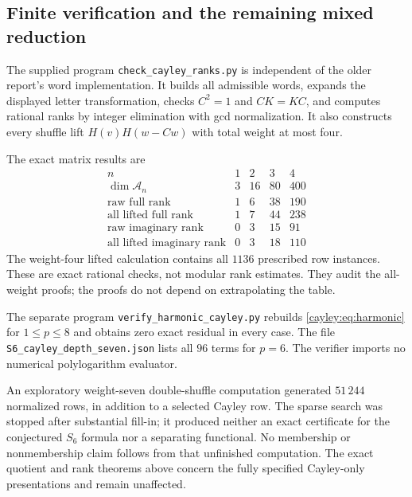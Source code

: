 \subsection{Finite verification and the remaining mixed reduction}

The supplied program \texttt{check\_cayley\_ranks.py} is independent
of the older report's word implementation.  It builds all admissible
words, expands the displayed letter transformation, checks $C^2=1$
and $CK=KC$, and computes rational ranks by integer elimination
with gcd normalization.  It also constructs every shuffle lift
$H(v)H(w-Cw)$ with total weight at most four.

The exact matrix results are
\[
\begin{array}{c|rrrr}
n&1&2&3&4\\ \hline
\dim\mathcal A_n&3&16&80&400\\
\text{raw full rank}&1&6&38&190\\
\text{all lifted full rank}&1&7&44&238\\
\text{raw imaginary rank}&0&3&15&91\\
\text{all lifted imaginary rank}&0&3&18&110
\end{array}
\]
The weight-four lifted calculation contains all $1136$ prescribed
row instances.  These are exact rational checks, not modular rank
estimates.  They audit the all-weight proofs; the proofs do not
depend on extrapolating the table.

The separate program \texttt{verify\_harmonic\_cayley.py} rebuilds
\eqref{cayley:eq:harmonic} for $1\le p\le8$ and obtains zero exact
residual in every case.  The file
\texttt{S6\_cayley\_depth\_seven.json} lists all $96$ terms for
$p=6$.  The verifier imports no numerical polylogarithm evaluator.

An exploratory weight-seven double-shuffle computation generated
$51\,244$ normalized rows, in addition to a selected Cayley row.
The sparse search was stopped after substantial fill-in; it
produced neither an exact certificate for the conjectured $S_6$
formula nor a separating functional.  No membership or
nonmembership claim follows from that unfinished computation.
The exact quotient and rank theorems above concern the fully
specified Cayley-only presentations and remain unaffected.
